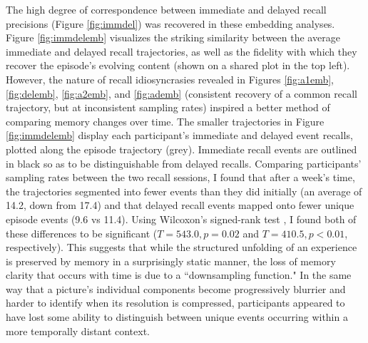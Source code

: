\documentclass{article}
\begin{document}
The high degree of correspondence between immediate and delayed recall precisions (Figure \ref{fig:immdel}) was recovered in these embedding analyses. Figure \ref{fig:immdelemb} visualizes the striking similarity between the average immediate and delayed recall trajectories, as well as the fidelity with which they recover the episode's evolving content (shown on a shared plot in the top left).  However, the nature of recall idiosyncrasies revealed in Figures \ref{fig:a1emb}, \ref{fig:delemb}, \ref{fig:a2emb}, and \ref{fig:ademb} (consistent recovery of a common recall trajectory, but at inconsistent sampling rates) inspired a better method of comparing memory changes over time.  The smaller trajectories in Figure \ref{fig:immdelemb} display each participant's immediate and delayed event recalls, plotted along the episode trajectory (grey).  Immediate recall events are outlined in black so as to be distinguishable from delayed recalls.  Comparing participants' sampling rates between the two recall sessions, I found that after a week's time, the trajectories segmented into fewer events than they did initially (an average of 14.2, down from 17.4) and that delayed recall events mapped onto fewer unique episode events (9.6 vs 11.4).  Using Wilcoxon's signed-rank test \citep{Wilc45}, I found both of these differences to be significant ($T=543.0, p=0.02$ and $T=410.5, p<0.01$, respectively).  This suggests that while the structured unfolding of an experience is preserved by memory in a surprisingly static manner, the loss of memory clarity that occurs with time is due to a ``downsampling function." In the same way that a picture's individual components become progressively blurrier and harder to identify when its resolution is compressed, participants appeared to have lost some ability to distinguish between unique events occurring within a more temporally distant context.
\end{document}
